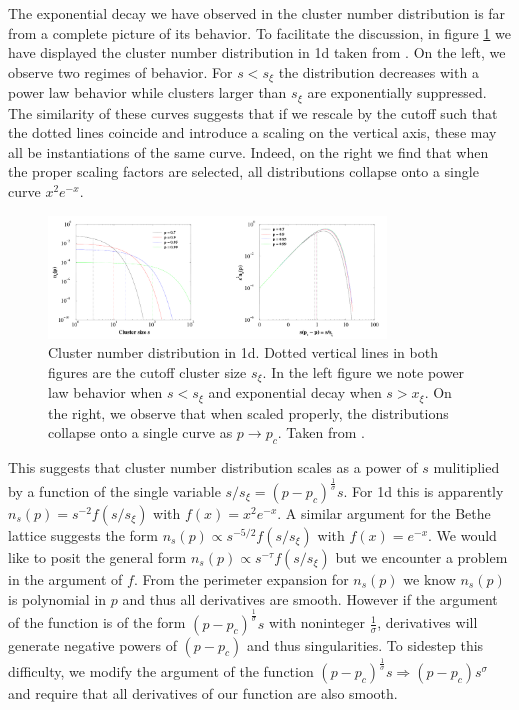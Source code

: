 The exponential decay we have observed in the cluster number distribution is far
from a complete picture of its behavior. To facilitate the discussion, in figure
\ref{fig:cluster_num_1d} we have displayed the cluster number distribution in 1d
taken from \cite{Christensen2002}.  On the left, we observe two regimes of behavior.
For $s<s_\xi$ the distribution decreases with a power law behavior while clusters
larger than $s_\xi$ are exponentially suppressed. The similarity of these curves
suggests that if we rescale by the cutoff such that the dotted lines coincide
and introduce a scaling on the vertical axis, these may all be instantiations
of the same curve.  Indeed, on the right we find that when the proper scaling
factors are selected, all distributions collapse onto a single curve $x^2 e^{-x}$.
\begin{figure}[h]
  \centering
    \includegraphics[width=0.8\textwidth]{cluster_num_1d_christensen}
  \caption{Cluster number distribution in 1d.  Dotted vertical lines in both
           figures are the cutoff cluster size $s_\xi$.  In the left figure we note
           power law behavior when $s<s_\xi$ and exponential decay when $s>x_\xi$.
           On the right, we observe that when scaled properly, the distributions 
           collapse onto a single curve as $p\to p_c$.
           Taken from \cite{Christensen2002}.}
  \label{fig:cluster_num_1d}
\end{figure}
This suggests that cluster number distribution scales as a power of $s$
mulitiplied by a function
of the single variable $s/s_\xi = (p-p_c)^{\frac{1}{\sigma}}s$. For 1d
this is apparently $n_s(p) = s^{-2} f(s/s_\xi)$ with $f(x) = x^2 e^{-x}$.
A similar argument for the Bethe lattice suggests the form 
$n_s(p) \propto s^{-5/2} f(s/s_\xi)$ with $f(x) = e^{-x}$.  We would like to
posit the general form $n_s(p) \propto s^{-\tau} f(s/s_\xi)$ but we
encounter a problem in the argument of $f$. From the 
perimeter expansion for $n_s(p)$ we
know $n_s(p)$ is polynomial in $p$ and thus all derivatives are smooth.
However if the argument of the function is of the form $(p-p_c)^{\frac{1}{\sigma}}s$
 with noninteger 
$\frac{1}{\sigma}$, derivatives will generate negative powers of $(p - p_c)$
and thus singularities. To sidestep this difficulty, we modify the argument of
the function $(p-p_c)^{\frac{1}{\sigma}}s \Rightarrow (p-p_c)s^\sigma$
and require that all derivatives of our function are also smooth.

